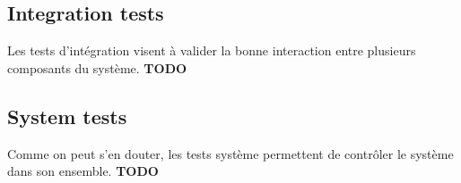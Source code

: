 \documentclass[a4paper]{report}
\begin{document}
\subsection*{Integration tests}
Les tests d'intégration visent à valider la bonne interaction entre plusieurs composants du système.{\color{red} \textbf{TODO}}\\

\subsection*{System tests}
Comme on peut s'en douter, les tests système permettent de contrôler le système dans son ensemble.{\color{red} \textbf{TODO}}\\

\end{document}
